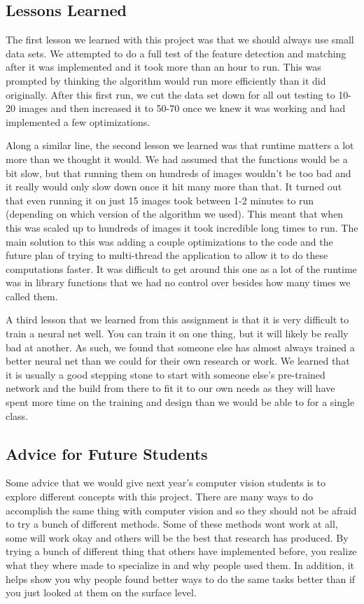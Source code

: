 \documentclass[12pt]{article}
\begin{document}
\subsection{Lessons Learned}
	The first lesson we learned with this project was that we should always use small data sets. We attempted to do a full test of the feature detection and matching after it was implemented and it took more than an hour to run. This was prompted by thinking the algorithm would run more efficiently than it did originally. After this first run, we cut the data set down for all out testing to 10-20 images and then increased it to 50-70 once we knew it was working and had implemented a few optimizations.
	
	Along a similar line, the second lesson we learned was that runtime matters a lot more than we thought it would. We had assumed that the functions would be a bit slow, but that running them on hundreds of images wouldn't be too bad and it really would only slow down once it hit many more than that. It turned out that even running it on just 15 images took between 1-2 minutes to run (depending on which version of the algorithm we used). This meant that when this was scaled up to hundreds of images it took incredible long times to run. The main solution to this was adding a couple optimizations to the code and the future plan of trying to multi-thread the application to allow it to do these computations faster. It was difficult to get around this one as a lot of the runtime was in library functions that we had no control over besides how many times we called them.
	
	A third lesson that we learned from this assignment is that it is very difficult to train a neural net well. You can train it on one thing, but it will likely be really bad at another. As such, we found that someone else has almost always trained a better neural net than we could for their own research or work. We learned that it is usually a good stepping stone to start with someone else's pre-trained network and the build from there to fit it to our own needs as they will have spent more time on the training and design than we would be able to for a single class.

\subsection{Advice for Future Students}
	Some advice that we would give next year's computer vision students is to explore different concepts with this project. There are many ways to do accomplish the same thing with computer vision and so they should not be afraid to try a bunch of different methods. Some of these methods wont work at all, some will work okay and others will be the best that research has produced. By trying a bunch of different thing that others have implemented before, you realize what they where made to specialize in and why people used them. In addition, it helps show you why people found better ways to do the same tasks better than if you just looked at them on the surface level.
\end{document}
